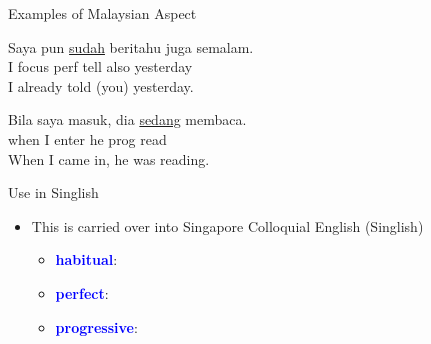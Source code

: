 \documentclass{beamer}
\newcommand{\txx}[1]{\textcolor{blue}{\textbf{#1}}}
\newcommand{\ul}[1]{\uline{#1}}
\begin{document}
\begin{frame}{Examples of Malaysian Aspect}
\begin{exe}
\ex
\gll Saya pun \ul{sudah} beritahu juga semalam. \\
    I focus perf tell also yesterday \\
\trans I already told (you) yesterday. \\
\end{exe}
\begin{exe}
\ex
\gll Bila saya masuk, dia \ul{sedang} membaca. \\
    when I enter he prog read \\
\trans When I came in, he was reading. \\
\end{exe}
\end{frame}

\begin{frame}{Use in Singlish}
  \begin{itemize}
  \item This is carried over into Singapore Colloquial English (Singlish)
    \begin{itemize}
    \item \txx{habitual}: 
    \item \txx{perfect}: 
    \item \txx{progressive}: 
    \end{itemize}
  \end{itemize}
  
\end{frame}

\end{document}
